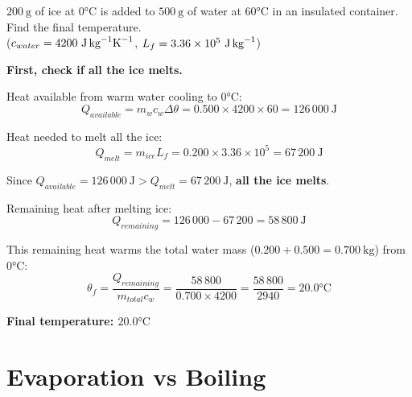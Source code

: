 \begin{examplebox}[15.5]
$200\ \text{g}$ of ice at $0°\text{C}$ is added to
$500\ \text{g}$ of water at $60°\text{C}$ in an
insulated container. Find the final temperature.\\
($c_{water} = 4200\ \text{J\,kg}^{-1}\text{K}^{-1}$,
$L_f = 3.36\times10^5\ \text{J\,kg}^{-1}$)
\end{examplebox}

\begin{solutionbox}
\textbf{First, check if all the ice melts.}

Heat available from warm water cooling to $0°\text{C}$:
\[
  Q_{available} = m_w c_w \Delta\theta
  = 0.500 \times 4200 \times 60
  = 126\,000\ \text{J}
\]

Heat needed to melt all the ice:
\[
  Q_{melt} = m_{ice} L_f
  = 0.200 \times 3.36\times10^5
  = 67\,200\ \text{J}
\]

Since $Q_{available} = 126\,000\ \text{J}
> Q_{melt} = 67\,200\ \text{J}$, \textbf{all the
ice melts}.

Remaining heat after melting ice:
\[
  Q_{remaining} = 126\,000 - 67\,200
  = 58\,800\ \text{J}
\]

This remaining heat warms the total water mass
($0.200 + 0.500 = 0.700\ \text{kg}$) from $0°\text{C}$:
\[
  \theta_f = \frac{Q_{remaining}}{m_{total}c_w}
  = \frac{58\,800}{0.700 \times 4200}
  = \frac{58\,800}{2940}
  = 20.0°\text{C}
\]

\textbf{Final temperature: $20.0°\text{C}$}
\end{solutionbox}

\section{Evaporation vs Boiling}


